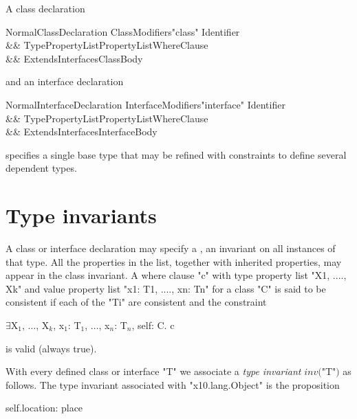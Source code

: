 A class declaration 

\begin{grammar}
NormalClassDeclaration \: 
      ClassModifiers\opt \xcd"class" Identifier  \\
   && TypePropertyList\opt PropertyList\opt WhereClause\opt \\
   && Extends\opt Interfaces\opt ClassBody \\
\end{grammar}

\noindent and an interface declaration

\begin{grammar}
NormalInterfaceDeclaration \: 
      InterfaceModifiers\opt \xcd"interface" Identifier  \\
   && TypePropertyList\opt PropertyList\opt WhereClause\opt \\
   && ExtendsInterfaces\opt InterfaceBody \\
\end{grammar}

\noindent
specifies a single base type that may be refined with constraints
to define several dependent types.

\section{Type invariants}\label{DepType:TypeInvariant}

A class or interface declaration may specify a
, an invariant on all
instances of that type.
All the properties in the list, together with inherited properties,
may appear in the class invariant. A where clause \xcd"c" with
type property list \xcd"X1, ...., Xk"
and value property list \xcd"x1: T1, ...., xn: Tn"
for a class \xcd"C" is said to be consistent if each of the \xcd"Ti" are
consistent and the constraint
\begin{xtenmath}
$\exists$X$_1$, $\dots$, X$_k$, x$_1$: T$_1$, $\dots$, x$_n$: T$_n$, self: C. c
\end{xtenmath}
\noindent is valid (always true).

With every defined class or interface \xcd"T" we associate a {\em type
invariant} $\mathit{inv}($\xcd"T"$)$ as follows. The type invariant associated with
\xcd"x10.lang.Object" is the proposition

\begin{xten}
self.location: place
\end{xten}

